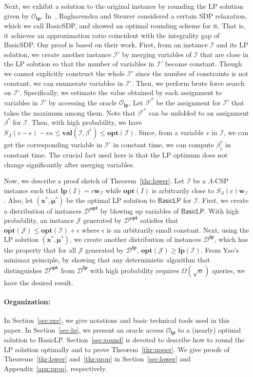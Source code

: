 \documentclass[letterpaper, 11pt]{article}
\newcommand{\calD}{\mathcal{D}}
\newcommand{\calI}{\mathcal{I}}
\newcommand{\calJ}{\mathcal{J}}
\newcommand{\calO}{\mathcal{O}}
\newcommand{\biw}{\boldsymbol{w}}
\newcommand{\bix}{\boldsymbol{x}}
\newcommand{\bimu}{\boldsymbol{\mu}}
\newcommand{\blp}{\textsf{BasicLP}\xspace}
\newcommand{\bsdp}{\textsf{BasicSDP}\xspace}
\newcommand{\lp}{\mathbf{lp}}
\newcommand{\opt}{\mathbf{opt}}
\newcommand{\val}{\mathbf{val}}
\newcommand{\olopt}{\overline{\mathbf{opt}}}
\newcommand{\ollp}{\overline{\mathbf{lp}}}
\begin{document}
Next, we exhibit a solution to the original instance by rounding the LP solution given by $\calO_{\lp}$.
In~\cite{RS09}, Raghavendra and Steurer considered a certain SDP relaxation, which we call \bsdp,
and showed an optimal rounding scheme for it.
That is, it achieves an approximation ratio coincident with the integrality gap of \bsdp.
Our proof is based on their work.
First, from an instance $\calI$ and its LP solution,
we create another instance $\calI'$ by merging variables of $\calI$ that are close in the LP solution
so that the number of variables in $\calI'$ become constant.
Though we cannot explicitly construct the whole $\calI'$ since the number of constraints is not constant,
we can enumerate variables in $\calI'$.
Then, we perform brute force search on $\calI'$.
Specifically, we estimate the value obtained by each assignment to variables in $\calI'$ by accessing the oracle $\calO_{\lp}$.
Let $\beta'^*$ be the assignment for $\calI'$ that takes the maximum among them.
Note that $\beta'^*$ can be unfolded to an assignment $\beta^*$ for $\calI$.
Then, with high probability, we have $S_{\Lambda}(c-\epsilon)-\epsilon n \leq \val(\calI,\beta^*) \leq \opt(\calI)$.
Since, from a variable $v$ in $\calI$, we can get the corresponding variable in $\calI'$ in constant time,
we can compute $\beta_v^*$ in constant time.
The crucial fact used here is that the LP optimum does not change significantly after merging variables.

Now, we describe a proof sketch of Theorem~\ref{thr:lower}.
Let $\calI$ be a $\Lambda$-CSP instance such that $\lp(I)=c\biw_{\calI}$ while $\opt(I)$ is arbitrarily close to $S_{\Lambda}(c)\biw_{\calI}$.
Also, let $(\bix^*,\bimu^*)$ be the optimal LP solution to $\blp$ for $\calI$.
First, we create a distribution of instances $\calD^{\opt}$ by blowing up variables of $\blp$.
With high probability, 
an instance $\calJ$ generated by $\calD^{\opt}$ satisfies that $\olopt(\calJ) \leq \olopt(\calI)+\epsilon$ where $\epsilon$ is  an arbitrarily small constant.
Next, using the LP solution $(\bix^*,\bimu^*)$,
we create another distribution of instances $\calD^{\lp}$, 
which has the property that for all $\calJ$ generated by $\calD^{\lp}$, 
$\olopt(\calJ)\geq \ollp(\calI)$.
From Yao's minimax principle,
by showing that any deterministic algorithm that distinguishes $\calD^{\opt}$ from $\calD^{\lp}$ with high probability requires $\Omega(\sqrt{n})$ queries,
we have the desired result.

\vspace{-10pt}
\paragraph{Organization:}
In Section~\ref{sec:pre},
we give notations and basic technical tools used in this paper.
In Section~\ref{sec:lp},
we present an oracle access $\calO_{\lp}$ to a (nearly) optimal solution to \blp.
Section~\ref{sec:round} is devoted to describe how to round the LP solution optimally and to prove Theorem~\ref{thr:upper}.
We give proofs of Theorems~\ref{thr:lower} and~\ref{thr:prop} in Section~\ref{sec:lower} and Appendix~\ref{apx:prop}, respectively.
\end{document}
